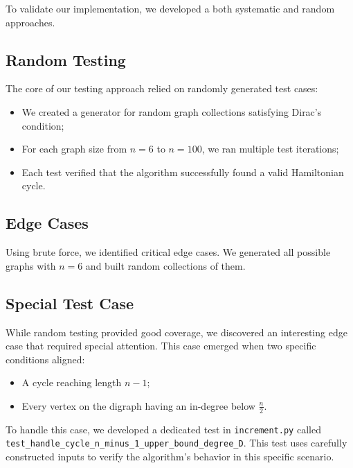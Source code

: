 To validate our implementation, we developed a both systematic and random approaches. 

\subsection{Random Testing}

The core of our testing approach relied on randomly generated test cases:

\begin{itemize}
    \item We created a generator for random graph collections satisfying Dirac's condition;
    \item For each graph size from $n=6$ to $n=100$, we ran multiple test iterations;
    \item Each test verified that the algorithm successfully found a valid Hamiltonian cycle.
\end{itemize}

\subsection{Edge Cases}

Using brute force, we identified critical edge cases. We generated all
possible graphs with $n = 6$ and built random collections of them.

\subsection{Special Test Case}

While random testing provided good coverage, we discovered an interesting edge case that required special attention. 
This case emerged when two specific conditions aligned:

\begin{itemize}
    \item A cycle reaching length $n-1$;
    \item Every vertex on the digraph having an in-degree below $\frac{n}{2}$.
\end{itemize}

To handle this case, we developed a dedicated test in \texttt{increment.py} called \texttt{test\_handle\_cycle\_n\_minus\_1\_upper\_bound\_degree\_D}. 
This test uses carefully constructed inputs to verify the algorithm's behavior in this specific scenario.
